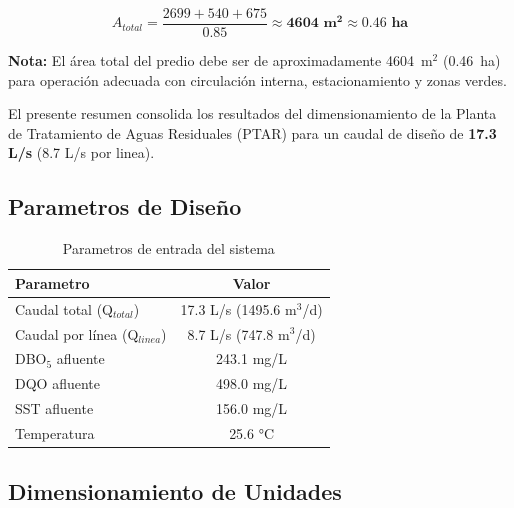 \documentclass[12pt,a4paper]{article}
\begin{document}
\begin{equation}
A_{total} = \frac{2699 + 540 + 675}{0.85} \approx \mathbf{4604 \text{ m}^2} \approx \mathbf{0.46 \text{ ha}}
\end{equation}

\textbf{Nota:} El área total del predio debe ser de aproximadamente 4604~m$^2$ (0.46~ha) para operación adecuada con circulación interna, estacionamiento y zonas verdes.

\newpage



El presente resumen consolida los resultados del dimensionamiento de la Planta de Tratamiento de Aguas Residuales (PTAR) para un caudal de dise\~no de \textbf{17.3 L/s} (8.7 L/s por linea).

\subsection{Parametros de Dise\~no}

\begin{table}[H]
\centering
\caption{Parametros de entrada del sistema}
\begin{tabular}{lc}
\toprule
\textbf{Parametro} & \textbf{Valor} \\
\midrule
Caudal total (Q$_{total}$) & 17.3 L/s (1495.6 m$^3$/d) \\
Caudal por línea (Q$_{linea}$) & 8.7 L/s (747.8 m$^3$/d) \\
DBO$_5$ afluente & 243.1 mg/L \\
DQO afluente & 498.0 mg/L \\
SST afluente & 156.0 mg/L \\
Temperatura & 25.6 °C \\
\bottomrule
\end{tabular}
\end{table}

\subsection{Dimensionamiento de Unidades}
\end{document}
